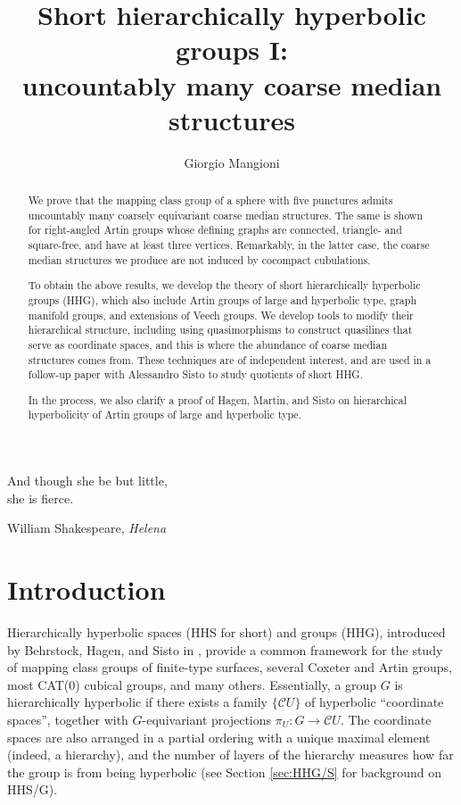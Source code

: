 \documentclass[svgnames]{amsart}
\title[Short HHG I]{Short hierarchically hyperbolic groups I:\\
uncountably many coarse median structures}
\author[G. Mangioni]{Giorgio Mangioni}
\theoremstyle{plain}
\theoremstyle{definition}
\newcommand{\C}{\mathcal C}
\begin{document}
\begin{abstract}
We prove that the mapping class group of a sphere with five punctures admits uncountably many coarsely equivariant coarse median structures. The same is shown for right-angled Artin groups whose defining graphs are connected, triangle- and square-free, and have at least three vertices. Remarkably, in the latter case, the coarse median structures we produce are not induced by cocompact cubulations. 

To obtain the above results, we develop the theory of short hierarchically hyperbolic groups (HHG), which also include Artin groups of large and hyperbolic type, graph manifold groups, and extensions of Veech groups. We develop tools to modify their hierarchical structure, including using quasimorphisms to construct quasilines that serve as coordinate spaces, and this is where the abundance of coarse median structures comes from. These techniques are of independent interest, and are used in a follow-up paper with Alessandro Sisto to study quotients of short HHG. 

In the process, we also clarify a proof of Hagen, Martin, and Sisto on hierarchical hyperbolicity of Artin groups of large and hyperbolic type. 
\end{abstract}

\maketitle

\epigraph{And though she be but little,\\she is fierce.}{William Shakespeare, \textit{Helena}}

\setcounter{tocdepth}{1}
\tableofcontents
\section*{Introduction}
Hierarchically hyperbolic spaces (HHS for short) and groups (HHG), introduced by Behrstock, Hagen, and Sisto in \cite{HHS_I}, provide a common framework for the study of mapping class groups of finite-type surfaces, several Coxeter and Artin groups, most CAT(0) cubical groups, and many others. Essentially, a group $G$ is hierarchically hyperbolic if there exists a family $\{\C U\}$ of hyperbolic “coordinate spaces”, together with $G$-equivariant projections $\pi_U\colon G\to \C U$. The coordinate spaces are also arranged in a partial ordering with a unique maximal element (indeed, a hierarchy), and the number of layers of the hierarchy measures how far the group is from being hyperbolic (see Section \ref{sec:HHG/S} for background on HHS/G).
\end{document}
